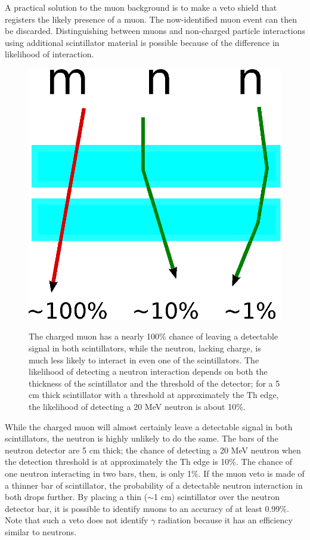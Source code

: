 A practical solution to the muon background is to make a veto shield that registers the likely presence of a muon.  The now-identified muon event can then be discarded.  Distinguishing between muons and non-charged particle interactions using additional scintillator material is possible because of the difference in likelihood of interaction.  
\begin{figure}[hp]
\centering
\includegraphics[width=1.0\textwidth]{figures/simpleVeto.eps}
\label{fig:simpleVeto}
\caption{The charged muon has a nearly 100\% chance of leaving a detectable signal in both scintillators, while the neutron, lacking charge, is much less likely to interact in even one of the scintillators.  The likelihood of detecting a neutron interaction depends on both the thickness of the scintillator and the threshold of the detector; for a 5 cm thick scintillator with a threshold at approximately the Th edge, the likelihood of detecting a 20 MeV neutron is about 10\%.}
\end{figure}
While the charged muon will almost certainly leave a detectable signal in both scintillators, the neutron is highly unlikely to do the same.  The bars of the neutron detector are 5 cm thick; the chance of detecting a 20 MeV neutron when the detection threshold is at approximately the Th edge is 10\%.  The chance of one neutron interacting in two bars, then, is only 1\%.  If the muon veto is made of a thinner bar of scintillator, the probability of a detectable neutron interaction in both drops further.  By placing a thin ($\sim$1 cm) scintillator over the neutron detector bar, it is possible to identify muons to an accuracy of at least 0.99\%.  Note that such a veto does not identify $\gamma$ radiation because it has an efficiency similar to neutrons.


